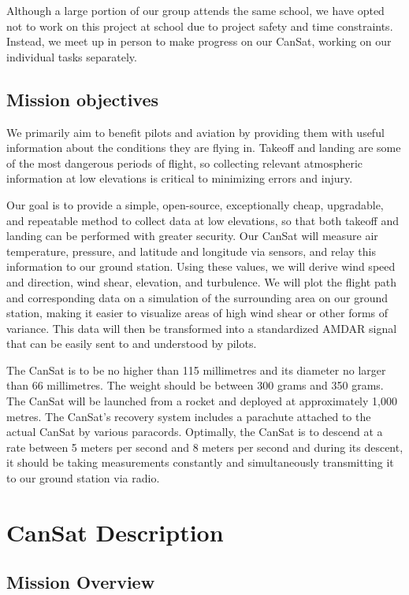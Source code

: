 \documentclass[10pt,twocolumn]{article}
\begin{document}
Although a large portion of our group attends the same school, we have opted not to work on this project at school due to project safety and time constraints. Instead, we meet up in person to make progress on our CanSat, working on our individual tasks separately.

\subsection{\textbf{Mission objectives}}

We primarily aim to benefit pilots and aviation by providing them with useful information about the conditions they are flying in. Takeoff and landing are some of the most dangerous periods of flight, so collecting relevant atmospheric information at low elevations is critical to minimizing errors and injury.

Our goal is to provide a simple, open-source, exceptionally cheap, upgradable, and repeatable method to collect data at low elevations, so that both takeoff and landing can be performed with greater security. Our CanSat will measure air temperature, pressure, and latitude and longitude via sensors, and relay this information to our ground station. Using these values, we will derive wind speed and direction, wind shear, elevation, and turbulence. We will plot the flight path and corresponding data on a simulation of the surrounding area on our ground station, making it easier to visualize areas of high wind shear or other forms of variance. This data will then be transformed into a standardized AMDAR signal that can be easily sent to and understood by pilots.

The CanSat is to be no higher than 115 millimetres and its diameter no larger than 66 millimetres. The weight should be between 300 grams and 350 grams. The CanSat will be launched from a rocket and deployed at approximately 1,000 metres. The CanSat’s recovery system includes a parachute attached to the actual CanSat by various paracords. Optimally, the CanSat is to descend at a rate between 5 meters per second and 8 meters per second and during its descent, it should be taking measurements constantly and simultaneously transmitting it to our ground station via radio.


\section{\textbf{CanSat Description}}

\subsection{\textbf{Mission Overview}}
\end{document}
